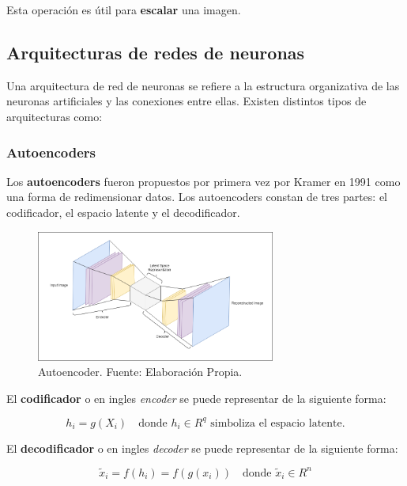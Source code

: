 Esta operación es útil para \textbf{escalar} una imagen.

\subsection{Arquitecturas de redes de neuronas}

\quad Una arquitectura de red de neuronas se refiere a la estructura organizativa de las neuronas artificiales y las conexiones entre ellas\cite{arqnn}. Existen distintos tipos de arquitecturas como:

\subsubsection{Autoencoders}
\quad Los \textbf{autoencoders} fueron propuestos por primera vez por Kramer en 1991 como una forma de redimensionar datos\cite{autoencoder,michelucci2022autoencoders}. Los autoencoders constan de tres partes: el codificador, el espacio latente y el decodificador.

\begin{figure}[H]
	\centering
	\includegraphics[width=0.7\textwidth]{figures/latent_representation_AE.png}
	\caption{\label{fig:latentrepresentation}Autoencoder. Fuente: Elaboración Propia.}
\end{figure}

El \textbf{codificador} o en ingles \textit{encoder} se puede representar de la siguiente forma\cite{michelucci2022autoencoders}:

\begin{equation}
	h_i = g(X_i) \quad \text{donde } h_i \in R^q \text{ simboliza el espacio latente.} \label{eq:autoencoder1}
\end{equation}

El \textbf{decodificador} o en ingles \textit{decoder} se puede representar de la siguiente forma:

\begin{equation}
	\tilde{x}_i = f(h_i) = f(g(x_i)) \quad \text{donde } \tilde{x}_i \in R^n \label{eq:autoencoder2}
\end{equation}

